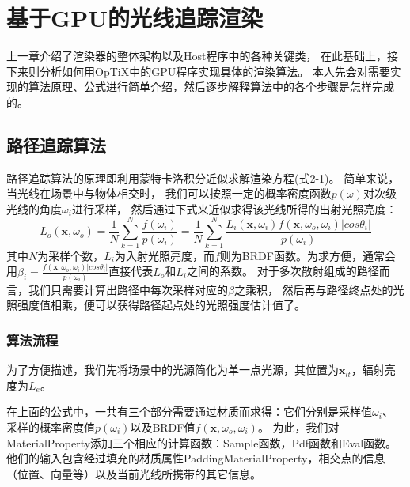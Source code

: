 \chapter{基于GPU的光线追踪渲染}
\label{cha:algorithms}

上一章介绍了渲染器的整体架构以及Host程序中的各种关键类，
在此基础上，接下来则分析如何用OpTiX中的GPU程序实现具体的渲染算法。
本人先会对需要实现的算法原理、公式进行简单介绍，然后逐步解释算法中的各个步骤是怎样完成的。

\section{路径追踪算法}
路径追踪算法的原理即利用蒙特卡洛积分近似求解渲染方程(式2-1)。
简单来说，当光线在场景中与物体相交时，
我们可以按照一定的概率密度函数$p(\omega)$对次级光线的角度$\omega_i$进行采样，
然后通过下式来近似求得该光线所得的出射光照亮度：
\begin{equation}
L_o(\textbf{x}, \omega_o) 
=\frac{1}{N}\sum_{k=1}^{N}\frac{f(\omega_i)}{p(\omega_i)} 
=\frac{1}{N}\sum_{k=1}^{N}\frac{L_i(\textbf{x}, \omega_i)f(\textbf{x}, \omega_o, \omega_i)|cos\theta_i|}{p(\omega_i)}
\end{equation}
其中$N$为采样个数，$L_i$为入射光照亮度，而$f$则为BRDF函数。为求方便，通常会用$\beta_i=\frac{f(\textbf{x}, \omega_o, \omega_i)|cos\theta_i|}{p(\omega_i)}$直接代表$L_o$和$L_i$之间的系数。
对于多次散射组成的路径而言，我们只需要计算出路径中每次采样对应的$\beta$之乘积，
然后再与路径终点处的光照强度值相乘，便可以获得路径起点处的光照强度估计值了。

\subsection{算法流程}
\label{cha:pathtrace}

为了方便描述，我们先将场景中的光源简化为单一点光源，其位置为$\textbf{x}_{lt}$，辐射亮度为$L_e$。

在上面的公式中，一共有三个部分需要通过材质而求得：它们分别是采样值$\omega_i$、
采样的概率密度值$p(\omega_i)$以及BRDF值$f(\textbf{x}, \omega_o, \omega_i)$。
为此，我们对MaterialProperty添加三个相应的计算函数：Sample函数，Pdf函数和Eval函数。
他们的输入包含经过填充的材质属性PaddingMaterialProperty，相交点的信息（位置、向量等）以及当前光线所携带的其它信息。

